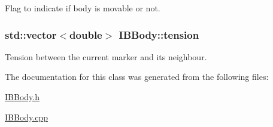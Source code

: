 Flag to indicate if body is movable or not. 

\subsubsection[{\texorpdfstring{tension}{tension}}]{\setlength{\rightskip}{0pt plus 5cm}std\+::vector$<$double$>$ I\+B\+Body\+::tension\hspace{0.3cm}{\ttfamily [protected]}}\hypertarget{class_i_b_body_ab786e24bc2b303eefcf286e0138cb2d1}{}\label{class_i_b_body_ab786e24bc2b303eefcf286e0138cb2d1}


Tension between the current marker and its neighbour. 



The documentation for this class was generated from the following files\+:\begin{DoxyCompactItemize}
\item 
\hyperlink{_i_b_body_8h}{I\+B\+Body.\+h}\item 
\hyperlink{_i_b_body_8cpp}{I\+B\+Body.\+cpp}\end{DoxyCompactItemize}
